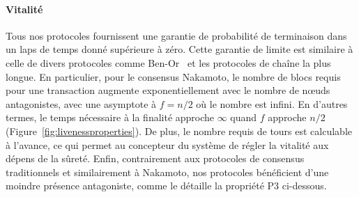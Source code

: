 \documentclass[letterpaper,twocolumn,10pt]{article}
\newcommand{\tronly}[2]{#1}
\theoremstyle{definition}
\begin{document}
\paragraph{Vitalité} Tous nos protocoles fournissent une garantie de probabilité de terminaison dans un laps de temps donné supérieure à zéro.
Cette garantie de limite est similaire à celle de divers protocoles comme Ben-Or~\cite{ben1983another} et les protocoles de chaîne la plus longue.
En particulier, pour le consensus Nakamoto, le nombre de blocs requis pour une transaction augmente exponentiellement avec le nombre de nœuds antagonistes, avec une asymptote à $f = n/2$ où le nombre est infini. %
En d'autres termes, le temps nécessaire à la finalité approche $\infty$ quand $f$ approche $n/2$\tronly{ (Figure~\ref{fig:livenessproperties}).}{.}
De plus, le nombre requis de tours est calculable à l'avance, ce qui permet au concepteur du système de régler la vitalité aux dépens de la sûreté. Enfin, contrairement aux protocoles de consensus traditionnels et similairement à Nakamoto, nos protocoles bénéficient d'une moindre présence antagoniste, comme le détaille la propriété P3 ci-dessous.
\end{document}
